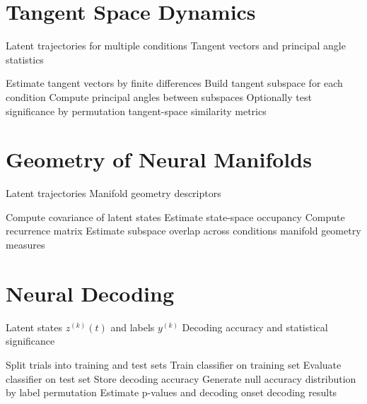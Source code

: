 \documentclass[11pt]{report}
\begin{document}
\section{Tangent Space Dynamics}

\begin{algorithm}[H]
\caption{Tangent-space analysis}
\begin{algorithmic}[1]
\Require Latent trajectories for multiple conditions
\Ensure Tangent vectors and principal angle statistics

\State Estimate tangent vectors by finite differences
\State Build tangent subspace for each condition
\State Compute principal angles between subspaces
\State Optionally test significance by permutation
\State \Return tangent-space similarity metrics
\end{algorithmic}
\end{algorithm}

\section{Geometry of Neural Manifolds}

\begin{algorithm}[H]
\caption{Neural manifold geometry}
\begin{algorithmic}[1]
\Require Latent trajectories
\Ensure Manifold geometry descriptors

\State Compute covariance of latent states
\State Estimate state-space occupancy
\State Compute recurrence matrix
\State Estimate subspace overlap across conditions
\State \Return manifold geometry measures
\end{algorithmic}
\end{algorithm}

\section{Neural Decoding}

\begin{algorithm}[H]
\caption{Latent-state decoding}
\begin{algorithmic}[1]
\Require Latent states $z^{(k)}(t)$ and labels $y^{(k)}$
\Ensure Decoding accuracy and statistical significance

    \State Split trials into training and test sets
    \State Train classifier on training set
    \State Evaluate classifier on test set
    \State Store decoding accuracy
\EndFor
\State Generate null accuracy distribution by label permutation
\State Estimate p-values and decoding onset
\State \Return decoding results
\end{algorithmic}
\end{algorithm}
\end{document}
